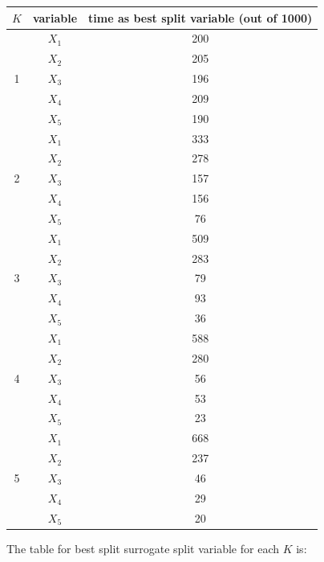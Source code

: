 \documentclass[paper=letter, fontsize=12pt]{article}
\begin{document}
\begin{enumerate}[label=(\alph*)]
\begin{enumerate}[label=(\roman*)]
		\begin{center}
			\begin{longtable}{|c|c|c|}
				\hline
				$K$ & variable & time as best split variable (out of 1000) \\ \hline
				\multirow{5}{1em}{1} & $X_1$ & 200 \\ 
				& $X_2$ & 205 \\
				& $X_3$ & 196 \\
				& $X_4$ & 209 \\
				& $X_5$ & 190 \\
				\hline
				\multirow{5}{1em}{2} & $X_1$ & 333 \\ 
				& $X_2$ & 278 \\
				& $X_3$ & 157 \\
				& $X_4$ & 156 \\
				& $X_5$ & 76 \\
				\hline
				\multirow{5}{1em}{3} & $X_1$ & 509 \\ 
				& $X_2$ & 283 \\
				& $X_3$ & 79 \\
				& $X_4$ & 93 \\
				& $X_5$ & 36 \\
				\hline
				\multirow{5}{1em}{4} & $X_1$ & 588 \\ 
				& $X_2$ & 280 \\
				& $X_3$ & 56 \\
				& $X_4$ & 53 \\
				& $X_5$ & 23 \\
				\hline
				\multirow{5}{1em}{5} & $X_1$ & 668 \\ 
				& $X_2$ & 237 \\
				& $X_3$ & 46 \\
				& $X_4$ & 29 \\
				& $X_5$ & 20 \\
				\hline
			\end{longtable}
		\end{center}	
		
		The table for best split surrogate split variable for each $K$ is:
		

\end{enumerate}
\end{enumerate}
\end{document}
